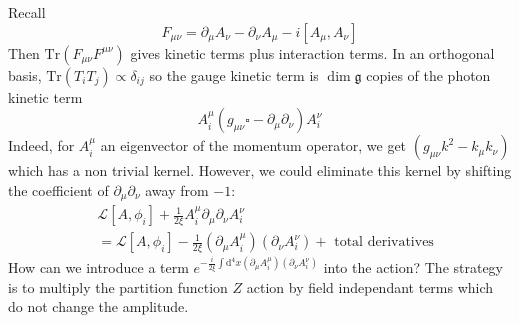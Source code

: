 \documentclass[a4paper]{book}
\theoremstyle{definition}
\theoremstyle{remark}
\begin{document}
Recall 
\begin{equation}
    F_{\mu\nu} = \partial_\mu A_\nu - \partial_\nu A_\mu - i[A_\mu, A_\nu]
\end{equation}
Then $\text{Tr}(F_{\mu\nu}F^{\mu\nu})$ gives kinetic terms plus interaction terms. In an orthogonal basis, $\text{Tr}(T_iT_j)\propto \delta_{ij}$ so the gauge kinetic term is $\dim \mathfrak{g}$ copies of the photon kinetic term 
\begin{equation}
    A_i^\mu (g_{\mu\nu}\square - \partial_\mu\partial_\nu)A^\nu_i
\end{equation}
Indeed, for $A^\mu_i$ an eigenvector of the momentum operator, we get $(g_{\mu\nu}k^2 - k_\mu k_\nu)$ which has a non trivial kernel. However, we could eliminate this kernel by shifting the coefficient of $\partial_\mu\partial_\nu$ away from $-1$: 
\begin{equation}
    \begin{aligned}
        &\mathcal{L}[A, \phi_i] + \frac{1}{2\xi} A_i^\mu \partial_\mu\partial_\nu A^\nu_i \\
        &= \mathcal{L}[A, \phi_i] - \frac{1}{2\xi} (\partial_\mu A^\mu_i)(\partial_\nu A^\nu_i) + \text{ total derivatives}
    \end{aligned}
\end{equation}
How can we introduce a term $e^{-\frac{i}{2\xi}\int \text{d}^4x(\partial_\mu A^\mu_i)(\partial_\nu A^\nu_i)}$ into the action? The strategy is to multiply the partition function $Z$ action by field independant terms which do not change the amplitude. \par \medskip 
\end{document}
